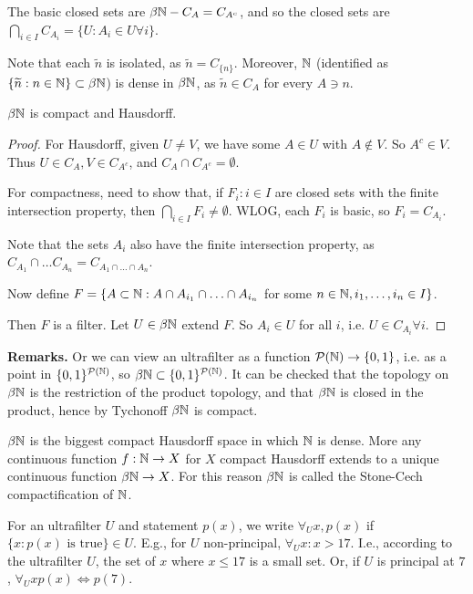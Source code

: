 \documentclass[10pt,a4paper]{article}
\begin{document}
The basic closed sets are $\beta \mathbb{N}-C_A = C_{A^c}$, and so the closed sets are $\bigcap_{i \in I}C_{A_i} =\{U: A_i \in U \forall i \}$.

Note that each $\tilde{n}$ is isolated, as $\tilde{n} = C_{\{n\}}$. Moreover, $\mathbb{N}$ (identified as $\{\widetilde{n}: n \in \mathbb{N}\}\subset \beta \mathbb{N}$) is dense in $\beta \mathbb{N}$, as $\tilde{n} \in C_A$ for every $A \ni n$.
\begin{theorem}
  $\beta \mathbb{N}$ is compact and Hausdorff.
\end{theorem}
\begin{proof}
  For Hausdorff, given $U \neq V$, we have some $A \in U$ with $A \notin V$. So $A^c \in V$. Thus $U \in C_A, V \in C_{A^c}$, and $C_A \cap C_{A^c} = \emptyset$.

  For compactness, need to show that, if $F_i: i \in I$ are closed sets with the finite intersection property, then $\bigcap_{i \in I}F_i \neq \emptyset$. WLOG, each $F_i$ is basic, so $F_i = C_{A_i}$.

  Note that the sets $A_i$ also have the finite intersection property, as $C_{A_1}\cap \ldots C_{A_n} = C_{A_1 \cap \ldots \cap A_n}$.

  Now define $F = \{A \subset \mathbb{N}: A \cap A_{i_1}\cap \ldots \cap A_{i_n}$ for some $n \in \mathbb{N}, i_1, \ldots, i_n \in I\}$.

  Then $F$ is a filter. Let $U \in \beta \mathbb{N}$ extend $F$. So $A_i \in U$ for all $i$, i.e. $U \in C_{A_i} \forall i$.
\end{proof}
\textbf{Remarks.} Or we can view an ultrafilter as a function $\mathcal{P}(\mathbb{N}) \to \{0,1\}$, i.e. as a point in $\{0,1\}^{\mathcal{P}(\mathbb{N})}$, so $\beta \mathbb{N} \subset \{0,1\}^{\mathcal{P}(\mathbb{N})}$. It can be checked that the topology on $\beta \mathbb{N}$ is the restriction of the product topology, and that $\beta \mathbb{N}$ is closed in the product, hence by Tychonoff $\beta \mathbb{N}$ is compact.

$\beta \mathbb{N}$ is the biggest compact Hausdorff space in which $\mathbb{N}$ is dense. More any continuous function $f:\mathbb{N} \to X$ for $X$ compact Hausdorff extends to a unique continuous function $\beta \mathbb{N} \to X$. For this reason $\beta \mathbb{N}$ is called the Stone-Cech compactification of $\mathbb{N}$.

For an ultrafilter $U$ and statement $p(x)$, we write $\forall_U x, p(x)$ if $\{x:p(x)\text{ is true}\}\in U$. E.g., for $U$ non-principal, $\forall_U x : x > 17$. I.e., according to the ultrafilter $U$, the set of $x$ where $x \leq 17$ is a small set. Or, if $U$ is principal at $7$, $\forall_U x p(x) \iff p(7)$.
\end{document}
